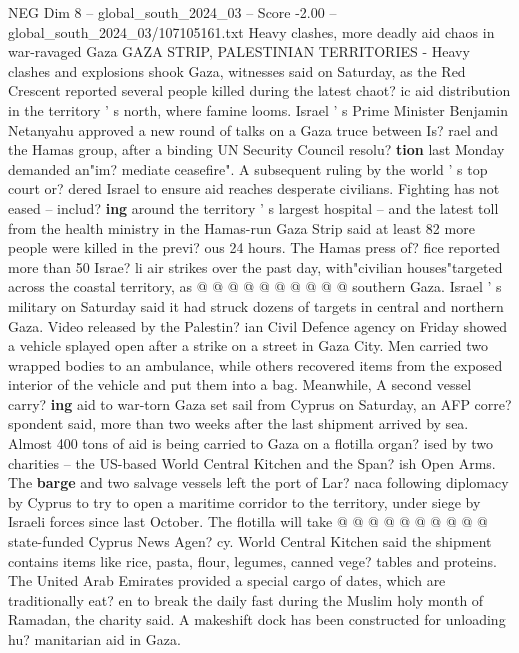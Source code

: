 \begin{textsample}{NEG Dim 8 – global\_south\_2024\_03 – Score -2.00 – global\_south\_2024\_03/107105161.txt}  \label{ex:f8_neg_018}
Heavy clashes, more deadly aid chaos in war-ravaged Gaza GAZA STRIP, PALESTINIAN TERRITORIES - Heavy clashes and explosions shook Gaza, witnesses said on Saturday, as the Red Crescent reported several people killed during the latest chaot? ic aid distribution in the territory ' s north, where famine looms.
Israel ' s Prime Minister Benjamin Netanyahu approved a new round of talks on a Gaza truce between Is? rael and the Hamas group, after a binding UN Security Council resolu? \textbf{tion} last Monday demanded an"im? mediate ceasefire".
A subsequent ruling by the world ' s top court or? dered Israel to ensure aid reaches desperate civilians.
Fighting has not eased -- includ? \textbf{ing} around the territory ' s largest hospital -- and the latest toll from the health ministry in the Hamas-run Gaza Strip said at least 82 more people were killed in the previ? ous 24 hours.
The Hamas press of? fice reported more than 50 Israe? li air strikes over the past day, with"civilian houses"targeted across the coastal territory, as @ @ @ @ @ @ @ @ @ @ southern Gaza.
Israel ' s military on Saturday said it had struck dozens of targets in central and northern Gaza.
Video released by the Palestin? ian Civil Defence agency on Friday showed a vehicle splayed open after a strike on a street in Gaza City.
Men carried two wrapped bodies to an ambulance, while others recovered items from the exposed interior of the vehicle and put them into a bag.
Meanwhile, A second vessel carry? \textbf{ing} aid to war-torn Gaza set sail from Cyprus on Saturday, an AFP corre? spondent said, more than two weeks after the last shipment arrived by sea.
Almost 400 tons of aid is being carried to Gaza on a flotilla organ? ised by two charities -- the US-based World Central Kitchen and the Span? ish Open Arms.
The \textbf{barge} and two salvage vessels left the port of Lar? naca following diplomacy by Cyprus to try to open a maritime corridor to the territory, under siege by Israeli forces since last October.
The flotilla will take @ @ @ @ @ @ @ @ @ @ state-funded Cyprus News Agen? cy.
World Central Kitchen said the shipment contains items like rice, pasta, flour, legumes, canned vege? tables and proteins.
The United Arab Emirates provided a special cargo of dates, which are traditionally eat? en to break the daily fast during the Muslim holy month of Ramadan, the charity said.
A makeshift dock has been constructed for unloading hu? manitarian aid in Gaza.

\end{textsample}
